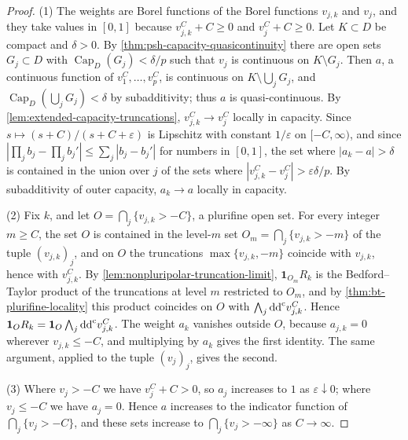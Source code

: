 \begin{proof}
(1) The weights are Borel functions of the Borel functions $v_{j,k}$ and $v_j$, and they take values in $[0,1]$ because $v_{j,k}^C+C\geq0$ and $v_j^C+C\geq0$. Let $K\subset D$ be compact and $\delta>0$. By \cref{thm:psh-capacity-quasicontinuity} there are open sets $G_j\subset D$ with $\operatorname{Cap}_D(G_j)<\delta/p$ such that $v_j$ is continuous on $K\setminus G_j$. Then $a$, a continuous function of $v_1^C,\ldots,v_p^C$, is continuous on $K\setminus\bigcup_jG_j$, and $\operatorname{Cap}_D(\bigcup_jG_j)<\delta$ by subadditivity; thus $a$ is quasi-continuous. By \cref{lem:extended-capacity-truncations}, $v_{j,k}^C\to v_j^C$ locally in capacity. Since $s\mapsto(s+C)/(s+C+\varepsilon)$ is Lipschitz with constant $1/\varepsilon$ on $[-C,\infty)$, and since $|\prod_jb_j-\prod_jb_j'|\leq\sum_j|b_j-b_j'|$ for numbers in $[0,1]$, the set where $|a_k-a|>\delta$ is contained in the union over $j$ of the sets where $|v_{j,k}^C-v_j^C|>\varepsilon\delta/p$. By subadditivity of outer capacity, $a_k\to a$ locally in capacity.

(2) Fix $k$, and let $O=\bigcap_j\{v_{j,k}>-C\}$, a plurifine open set. For every integer $m\geq C$, the set $O$ is contained in the level-$m$ set $O_m=\bigcap_j\{v_{j,k}>-m\}$ of the tuple $(v_{j,k})_j$, and on $O$ the truncations $\max\{v_{j,k},-m\}$ coincide with $v_{j,k}$, hence with $v_{j,k}^C$. By \cref{lem:nonpluripolar-truncation-limit}, $\mathbf1_{O_m}R_k$ is the Bedford--Taylor product of the truncations at level $m$ restricted to $O_m$, and by \cref{thm:bt-plurifine-locality} this product coincides on $O$ with $\bigwedge_j\mathrm{dd}^{\mathrm{c}} v_{j,k}^C$. Hence $\mathbf1_OR_k=\mathbf1_O\bigwedge_j\mathrm{dd}^{\mathrm{c}} v_{j,k}^C$. The weight $a_k$ vanishes outside $O$, because $a_{j,k}=0$ wherever $v_{j,k}\leq-C$, and multiplying by $a_k$ gives the first identity. The same argument, applied to the tuple $(v_j)_j$, gives the second.

(3) Where $v_j>-C$ we have $v_j^C+C>0$, so $a_j$ increases to $1$ as $\varepsilon\downarrow0$; where $v_j\leq-C$ we have $a_j=0$. Hence $a$ increases to the indicator function of $\bigcap_j\{v_j>-C\}$, and these sets increase to $\bigcap_j\{v_j>-\infty\}$ as $C\to\infty$.
\end{proof}

